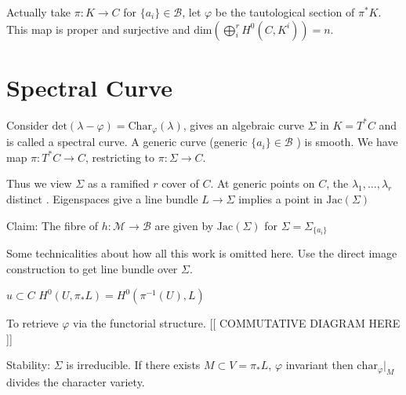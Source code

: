 Actually take $ \pi: K \rightarrow  C $ for $ \{ a_i \} \in \mathcal{B} $, 
let $ \varphi $ be the tautological section of $\pi^* K $. 
This map is proper and surjective and $ \mathrm{dim}(\bigoplus _i ^r H^{0} (C, K^i ) ) = n $. 

\section{Spectral Curve} %

Consider $ \mathrm{det}( \lambda - \varphi) = \mathrm{Char}_\varphi ( \lambda) $, 
gives an algebraic curve $\Sigma $ in $K = T^*C $ and is called a spectral curve. 
A generic curve (generic $\{a_i \} \in \mathcal{B}$ ) is smooth. 
We have map $ \pi: T^*C \rightarrow  C $, restricting to $\pi: \Sigma \rightarrow  C$. 

Thus we view $\Sigma$ as a ramified $r$ cover of $ C$. 
At generic points on $C$, the $\lambda_1, \dots, \lambda_r $ distinct . 
Eigenspaces give a line bundle $ L \rightarrow \Sigma $ implies a point in $\mathrm{Jac} (\Sigma) $

Claim: The fibre of $ h: \mathcal{M} \rightarrow \mathcal{B} $ are given by $\mathrm{Jac} (\Sigma) $ for $\Sigma = \Sigma_{\{a_i \}} $ 

Some technicalities about how all this work is omitted here. 
Use the direct image construction to get line bundle over $\Sigma$.

$u \subset C $ $H^0 (U, \pi_* L) = H^0 ( \pi^{-1} (U) , L) $

To retrieve $\varphi$ via the functorial structure.
[[ COMMUTATIVE DIAGRAM HERE ]] 

Stability: 
$\Sigma$ is irreducible. 
If there exists $M \subset V = \pi_* L $, 
$\varphi$ invariant then $ \mathrm{char}_\varphi |_M $ divides the character variety. 













 
